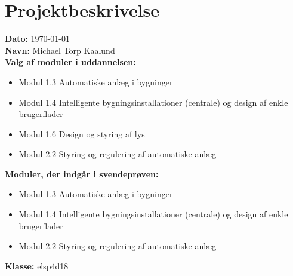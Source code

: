\section{Projektbeskrivelse}
\textbf{Dato:} \today \\
\textbf{Navn:} Michael Torp Kaalund\\
\textbf{Valg af moduler i uddannelsen:}
\begin{itemize}
    \item Modul 1.3 Automatiske anlæg i bygninger
    \item Modul 1.4 Intelligente bygningsinstallationer (centrale) og design af enkle brugerflader
    \item Modul 1.6 Design og styring af lys
    \item Modul 2.2 Styring og regulering af automatiske anlæg
\end{itemize}
\textbf{Moduler, der indgår i svendeprøven:}
\begin{itemize}
    \item Modul 1.3 Automatiske anlæg i bygninger
    \item Modul 1.4 Intelligente bygningsinstallationer (centrale) og design af enkle brugerflader
    \item Modul 2.2 Styring og regulering af automatiske anlæg
\end{itemize}
\textbf{Klasse:} elsp4d18

